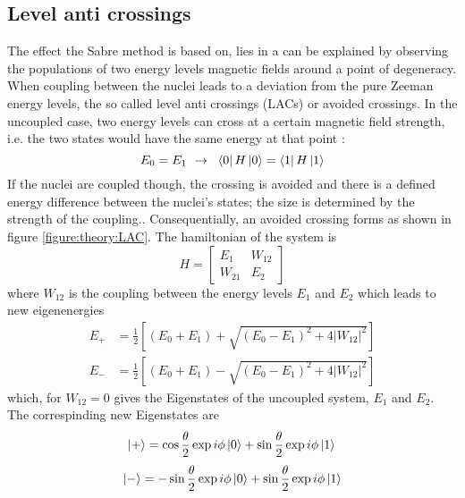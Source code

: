         \subsection{Level anti crossings}
        The effect the Sabre method is based on, lies in a can be explained by observing the populations of two energy levels magnetic fields around a point of degeneracy. When coupling between the nuclei leads to a deviation from the pure Zeeman energy levels, the so called level anti crossings (LACs) or avoided crossings. In the uncoupled case, two energy levels  can cross at a certain magnetic field strength, i.e. the two states would have the same energy at that point \cite{ivanov_role_2014-2,pravdivtsev_spin_2014}:
        \begin{equation}
            E_0 = E_1 \mathrm{~~\rightarrow~~} \bra{0}H\ket{0} = \bra{1}H\ket{1}
        \end{equation}
        If the nuclei are coupled though, the crossing is avoided and there is a defined energy difference between the nuclei's states; the size is determined by the strength of the coupling.. Consequentially, an avoided crossing forms as shown in figure \ref{figure:theory:LAC}. The hamiltonian of the system is
        \begin{equation}
            H = \left [
                \begin{array}{ll}
                    E_{1} & W_{12}\\
                    W_{21} & E_2
                \end{array}
            \right ]
        \end{equation} 
        where $W_{12}$ is the coupling between the energy levels $E_1$ and $E_2$ which leads to new eigenenergies
        \begin{align*}
            E_+ &= \frac{1}{2} \left[(E_0+ E_1) + \sqrt{(E_0-E_1)^2+4|W_{12}|^2}\right]\\
            E_- &= \frac{1}{2} \left[(E_0+ E_1) - \sqrt{(E_0-E_1)^2+4|W_{12}|^2}\right]
        \end{align*}
        which, for $W_{12}=0$ gives the Eigenstates of the uncoupled system, $E_1$ and $E_2$. The correspinding new Eigenstates are 
        \begin{equation*}
            \ket{+} = \cos\frac{{\theta}}{2}\exp{i\phi}\ket{0} + \sin{\frac{\theta}{2}}\exp{i\phi}\ket{1}\\
        \end{equation*}
        \begin{equation*}
            \ket{-} = -\sin{\frac{\theta}{2}}\exp{i\phi}\ket{0} + \sin{\frac{\theta}{2}}\exp{i\phi}\ket{1}
        \end{equation*}

